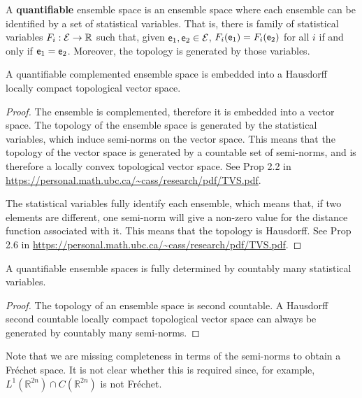 \begin{defn}
	A \textbf{quantifiable} ensemble space is an ensemble space where each ensemble can be identified by a set of statistical variables. That is, there is family of statistical variables $F_i : \mathcal{E} \to \mathbb{R}$ such that, given $\mathsf{e}_1, \mathsf{e}_2 \in \mathcal{E}$, $F_i(\mathsf{e}_1) = F_i(\mathsf{e}_2)$ for all $i$ if and only if $\mathsf{e}_1 = \mathsf{e}_2$. Moreover, the topology is generated by those variables.
\end{defn}

\begin{prop}
	A quantifiable complemented ensemble space is embedded into a Hausdorff locally compact topological vector space.
\end{prop}

\begin{proof}
	The ensemble is complemented, therefore it is embedded into a vector space. The topology of the ensemble space is generated by the statistical variables, which induce semi-norms on the vector space. This means that the topology of the vector space is generated by a countable set of semi-norms, and is therefore a locally convex topological vector space. See Prop 2.2 in \url{https://personal.math.ubc.ca/~cass/research/pdf/TVS.pdf}.
	
	The statistical variables fully identify each ensemble, which means that, if two elements are different, one semi-norm will give a non-zero value for the distance function associated with it. This means that the topology is Hausdorff. See Prop 2.6 in \url{https://personal.math.ubc.ca/~cass/research/pdf/TVS.pdf}.
\end{proof}

\begin{coro}
	A quantifiable ensemble spaces is fully determined by countably many statistical variables.
\end{coro}

\begin{proof}
	The topology of an ensemble space is second countable. A Hausdorff second countable locally compact topological vector space can always be generated by countably many semi-norms.
\end{proof}

\begin{remark}
	Note that we are missing completeness in terms of the semi-norms to obtain a Fr\'echet space. It is not clear whether this is required since, for example, $L^1(\mathbb{R}^{2n}) \cap C(\mathbb{R}^{2n})$ is not Fr\'echet.
\end{remark}


